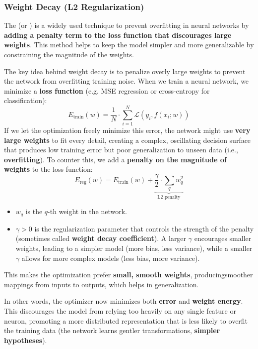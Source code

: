 \subsubsection{Weight Decay (L2 Regularization)}\label{sec:weight-decay-l2-regularization}

The  (or ) is a widely used technique to prevent overfitting in neural networks by \textbf{adding a penalty term to the loss function that discourages large weights}. This method helps to keep the model simpler and more generalizable by constraining the magnitude of the weights.

\highspace
The key idea behind weight decay is to penalize overly large weights to prevent the network from overfitting training noise. When we train a neural network, we minimize a \textbf{loss function} (e.g. MSE regression or cross-entropy for classification):
\begin{equation*}
    E_{\text{train}}(w) = \frac{1}{N} \cdot \sum_{i=1}^{N} \mathcal{L}\left(y_i, f\left(x_i; w\right)\right)
\end{equation*}
If we let the optimization freely minimize this error, the network might use \textbf{very large weights} to fit every detail, creating a complex, oscillating decision surface that produces low training error but poor generalization to unseen data (i.e., \textbf{overfitting}). To counter this, we add a \textbf{penalty on the magnitude of weights} to the loss function:
\begin{equation*}
    E_{\text{reg}}(w) = E_{\text{train}}(w) + \underbrace{\frac{\gamma}{2} \cdot \sum_{q} w_q^2}_{\text{L2 penalty}}
\end{equation*}
\begin{itemize}
    \item $w_q$ is the $q$-th weight in the network.
    \item $\gamma > 0$ is the regularization parameter that controls the strength of the penalty (sometimes called \textbf{weight decay coefficient}). A larger $\gamma$ encourages smaller weights, leading to a simpler model (more bias, less variance), while a smaller $\gamma$ allows for more complex models (less bias, more variance).
\end{itemize}
This makes the optimization prefer \textbf{small, smooth weights}, producing\break smoother mappings from inputs to outputs, which helps in generalization.

\highspace
In other words, the optimizer now minimizes both \textbf{error} and \textbf{weight energy}. This discourages the model from relying too heavily on any single feature or neuron, promoting a more distributed representation that is less likely to overfit the training data (the network learns gentler transformations, \textbf{simpler hypotheses}).

